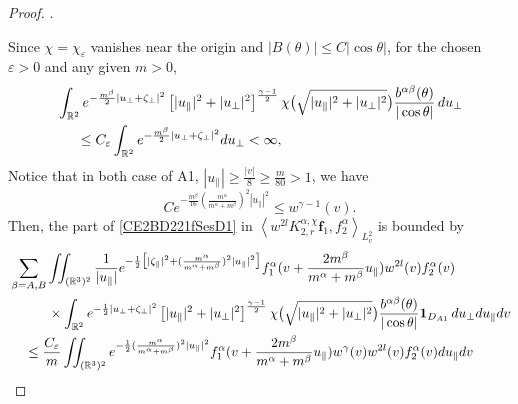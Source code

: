 \documentclass[reqno]{amsart}
\numberwithin{equation}{section}
\numberwithin{equation}{section}
\begin{document}
\begin{proof}
		
		.
		
		
		Since $\chi = \chi_\varepsilon$ vanishes near the origin and
		$|B(\theta)| \leq C|\cos \theta|$,  for the chosen $\varepsilon > 0$ and any given $m > 0$,
		\begin{equation*}
			\begin{split}
				&\int_{\mathbb{R}^2} e^{-\frac{m^\beta}{2}|u_{\perp} + \zeta_{\perp}|^2} \left[|u_{\parallel}|^2 + |u_{\perp}|^2\right]^{\frac{\gamma - 1}{2}} \chi\big(\sqrt{|u_{\parallel}|^2 + |u_{\perp}|^2}\big) \frac{b^{ \alpha \beta}(\theta)}{|\cos \theta|} \, du_{\perp} \\
				&\hspace{0.5cm}\leq C_\varepsilon \int_{\mathbb{R}^2} e^{-\frac{m^\beta}{2}|u_\perp + \zeta_\perp|^2} du_\perp < \infty,
			\end{split}
		\end{equation*}
		Notice that in both case of A1, $|u_\parallel|\geq\frac{|v|}{8}\geq \frac{m}{80}>1$, we have
		\begin{equation}\label{caseA1wgams}
		C e^{-\frac{m^\beta}{16}(\frac{m^\alpha}{m^\alpha+m^\beta})^2|u_{\parallel}|^2}	\leq w^{\gamma-1}(v).
		\end{equation}
		Then, the part of \eqref{CE2BD221fSesD1} in $\left \langle  w^{2l}K_{2,r}^{\alpha,\chi}\mathbf{f}_1,f^{\alpha}_2\right \rangle_{L^{2}_{v}}$ is bounded by 
		\begin{align}
			& \sum_{\beta=A,B}\iint_{(\mathbb{R}^3)^2} \frac{1}{|u_{\parallel}|} e^{-\frac{1}{2}\big[|\zeta_{\parallel}|^2+(\frac{m^\alpha}{m^\alpha+m^\beta})^2|u_{\parallel}|^2\big]} f^\alpha_1(v + \frac{2m^{\beta}}{m^{\alpha}+m^{\beta}}u_{\parallel}) w^{2l}(v)f^\alpha_2(v)\notag\\
			&\hspace{1cm} \times \int_{\mathbb{R}^2} e^{-\frac{1}{2}|u_{\perp} + \zeta_{\perp}|^2} \left[|u_{\parallel}|^2 + |u_{\perp}|^2\right]^{\frac{\gamma - 1}{2}} \chi\big(\sqrt{|u_{\parallel}|^2 + |u_{\perp}|^2}\big) \frac{b^{ \alpha \beta}(\theta)}{|\cos \theta|} \mathbf{1}_{D_{A1}}\, du_{\perp} du_{\parallel}dv\notag\\
			&\hspace{0.4cm}\leq \frac{C_\varepsilon}{m} \iint_{(\mathbb{R}^3)^2}e^{-\frac{1}{2}(\frac{m^\alpha}{m^\alpha+m^\beta})^2|u_{\parallel}|^2}f^\alpha_1(v + \frac{2m^{\beta}}{m^{\alpha}+m^{\beta}}u_{\parallel})w^{\gamma}(v) w^{2l}(v)f^\alpha_2(v)du_{\parallel}dv\notag\\

\end{align}
\end{proof}
\end{document}
